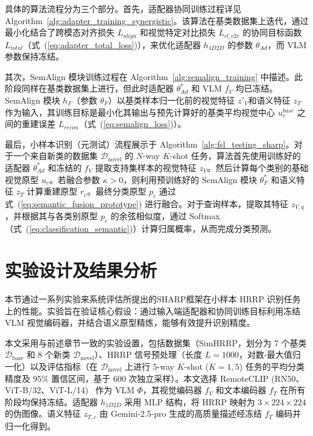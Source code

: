 具体的算法流程分为三个部分。首先，适配器协同训练过程详见 Algorithm~\ref{alg:adapter_training_synergistic}。该算法在基类数据集上迭代，通过最小化结合了跨模态对齐损失 $L_{align}$ 和视觉特定对比损失 $L_{cl\_v2v}$ 的协同目标函数 $L_{total}$（式~(\ref{eq:adapter_total_loss})），来优化适配器 $h_{1D2D}$ 的参数 $\theta_{Ad}$，而 VLM 参数保持冻结。

其次，SemAlign 模块训练过程在 Algorithm~\ref{alg:semalign_training} 中描述。此阶段同样在基类数据集上进行，但此时适配器 $\theta_{Ad}^*$ 和 VLM $f_V$ 均已冻结。SemAlign 模块 $h_F$（参数 $\theta_F$）以基类样本归一化前的视觉特征 $z'_V$和语义特征 $z_T$ 作为输入，其训练目标是最小化其输出与预先计算好的基类平均视觉中心 $u_c^{base}$ 之间的重建误差 $L_{recon}$（式~(\ref{eq:semalign_loss})）。

最后，小样本识别（元测试）流程展示于 Algorithm~\ref{alg:fsl_testing_sharp}。对于一个来自新类的数据集 $\mathcal{D}_{\text{novel}}$ 的 $N$-way $K$-shot 任务，算法首先使用训练好的适配器 $\theta_{Ad}^*$ 和冻结的 $f_V$ 提取支持集样本的视觉特征 $z_V$。然后计算每个类别的基础视觉原型 $u_c$。若融合参数 $\kappa > 0$，则利用预训练好的 SemAlign 模块 $\theta_F^*$ 和语义特征 $z_T$ 计算重建原型 $r_c$。最终分类原型 $p_c$ 通过式~(\ref{eq:semantic_fusion_prototype}) 进行融合。对于查询样本，提取其特征 $z_{V,q}$，并根据其与各类别原型 $p_c$ 的余弦相似度，通过 Softmax（式~(\ref{eq:classification_semantic})）计算归属概率，从而完成分类预测。 


 \section{实验设计及结果分析} \label{sec:experiments_semantic} 本节通过一系列实验来系统评估所提出的SHARP框架在小样本 HRRP 识别任务上的性能。实验旨在验证核心假设：通过输入端适配器和协同训练目标利用冻结 VLM 视觉编码器，并结合语义原型精炼，能够有效提升识别精度。 
 
 本文采用与前述章节一致的实验设置，包括数据集（SimHRRP，划分为 7 个基类 $\mathcal{D}_{\text{base}}$ 和 8 个新类 $\mathcal{D}_{\text{novel}}$）、HRRP 信号预处理（长度 $L=1000$，对数-最大值归一化）以及评估指标（在 $\mathcal{D}_{\text{novel}}$ 上进行 5-way $K$-shot ($K=1, 5$) 任务的平均分类精度及 95\% 置信区间，基于 600 次独立采样）。本文选择 RemoteCLIP (RN50、ViT-B/32、ViT-L/14)~\cite{RemoteCLIP} 作为 VLM $\Phi$，其视觉编码器 $f_V$ 和文本编码器 $f_T$ 在所有阶段均保持冻结。适配器 $h_{1D2D}$ 采用 MLP 结构，将 HRRP 映射为 $3 \times 224 \times 224$ 的伪图像。语义特征 $z_{T,c}$ 由 Gemini-2.5-pro 生成的高质量描述经冻结 $f_T$ 编码并归一化得到。 
 
